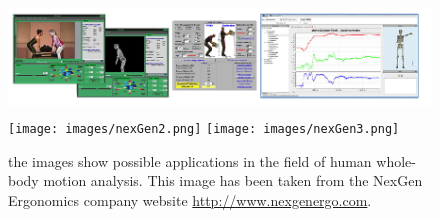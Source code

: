 \documentclass[12pt,a4paper,twoside]{article}
\begin{document}
\begin{figure}
\begin{center}
\includegraphics[height=3cm]{images/nexGen.png} \texttt{[image: images/nexGen2.png]} \texttt{[image: images/nexGen3.png]}
\caption{the images show possible applications in the field of human whole-body motion analysis. This image has been taken from the NexGen Ergonomics company website \protect\url{http://www.nexgenergo.com}. }\label{fig:nexGen}
\end{center}
\end{figure}
\end{document}
